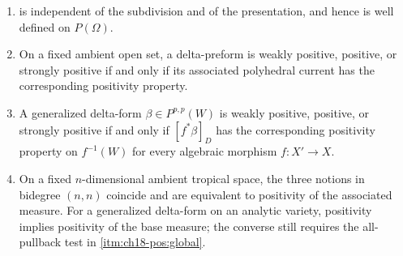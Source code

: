 \begin{lemma}
\label{lem:ch18-positivity-consistent}
\begin{enumerate}
\item\label{itm:ch18-pos:welldef}
  is independent of the subdivision and
 of the presentation, and hence is well defined on $P(\Omega)$.
\item\label{itm:ch18-pos:current}
 On a fixed ambient open set, a delta-preform is weakly positive, positive,
 or strongly positive if and only if its associated polyhedral current has
 the corresponding positivity property.
\item\label{itm:ch18-pos:global}
 A generalized delta-form $\beta\in P^{p,p}(W)$ is weakly positive,
 positive, or strongly positive if and only if $[f^*\beta]_D$ has the
 corresponding positivity property on $f^{-1}(W)$ for every algebraic
 morphism $f:X'\to X$.
\item\label{itm:ch18-pos:top}
 On a fixed $n$-dimensional ambient tropical space, the three notions in
 bidegree $(n,n)$ coincide and are equivalent to positivity of the
 associated measure.  For a generalized delta-form on an analytic variety,
 positivity implies positivity of the base measure; the converse still
 requires the all-pullback test in \cref{itm:ch18-pos:global}.
\end{enumerate}
\end{lemma}

